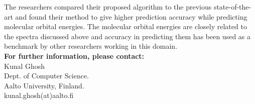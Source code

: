 \documentclass[a4paper]{article}
\begin{document}

The researchers compared their proposed algorithm to the previous state-of-the-art and found their method to give higher prediction accuracy while predicting molecular orbital energies. The molecular orbital energies are closely related to the spectra discussed above and accuracy in predicting them has been used as a benchmark by other researchers working in this domain.\\







 



\noindent \textbf{For further information, please contact:}\\

\noindent Kunal Ghosh\\
Dept. of Computer Science.\\
Aalto University, Finland.\\
kunal.ghosh(at)aalto.fi\\
\end{document}
